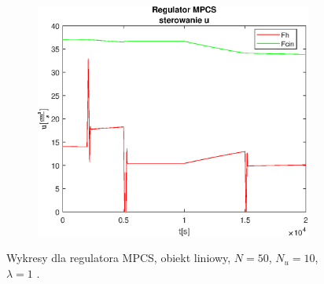 \begin{figure}[h!]
   \begin{subfigure}[b]{0.4\textwidth}
      \includegraphics[width=1\linewidth]{img/MPCSanaLin/MPCSLinControlN50Nu10l100.eps}
      \caption{}
      \label{fig:fig:MPCSLinN50Nu10l1003}
   \end{subfigure}
       
   \caption{Wykresy dla regulatora MPCS, obiekt liniowy, $N = 50$, $N_u = 10$, $\lambda = 1$ .}
   \label{fig:MPCSLinN50Nu10l100}
\end{figure}
           
